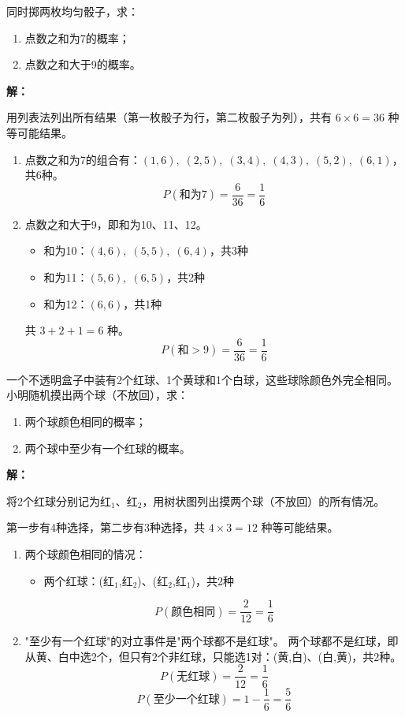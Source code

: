 \documentclass[12pt, a4paper]{ctexart}
\begin{document}
\begin{examplebox}[【例3】列表法求概率]
同时掷两枚均匀骰子，求：
\begin{enumerate}[label=(\arabic*)]
  \item 点数之和为7的概率；
  \item 点数之和大于9的概率。
\end{enumerate}
\end{examplebox}

\textbf{解：}

用列表法列出所有结果（第一枚骰子为行，第二枚骰子为列），共有 $6 \times 6 = 36$ 种等可能结果。

\begin{enumerate}[label=(\arabic*)]
  \item 点数之和为7的组合有：$(1,6),\;(2,5),\;(3,4),\;(4,3),\;(5,2),\;(6,1)$，共6种。
  \[
    P(\text{和为7}) = \frac{6}{36} = \frac{1}{6}
  \]

  \item 点数之和大于9，即和为10、11、12。
  \begin{itemize}[leftmargin=2em]
    \item 和为10：$(4,6),\;(5,5),\;(6,4)$，共3种
    \item 和为11：$(5,6),\;(6,5)$，共2种
    \item 和为12：$(6,6)$，共1种
  \end{itemize}
  共 $3 + 2 + 1 = 6$ 种。
  \[
    P(\text{和}>9) = \frac{6}{36} = \frac{1}{6}
  \]
\end{enumerate}

\begin{examplebox}[【例4】树状图求概率]
一个不透明盒子中装有2个红球、1个黄球和1个白球，这些球除颜色外完全相同。小明随机摸出两个球（不放回），求：
\begin{enumerate}[label=(\arabic*)]
  \item 两个球颜色相同的概率；
  \item 两个球中至少有一个红球的概率。
\end{enumerate}
\end{examplebox}

\textbf{解：}

将2个红球分别记为红$_1$、红$_2$，用树状图列出摸两个球（不放回）的所有情况。

第一步有4种选择，第二步有3种选择，共 $4 \times 3 = 12$ 种等可能结果。

\begin{enumerate}[label=(\arabic*)]
  \item 两个球颜色相同的情况：
  \begin{itemize}[leftmargin=2em]
    \item 两个红球：(红$_1$,红$_2$)、(红$_2$,红$_1$)，共2种
  \end{itemize}
  \[
    P(\text{颜色相同}) = \frac{2}{12} = \frac{1}{6}
  \]

  \item "至少有一个红球"的对立事件是"两个球都不是红球"。
  两个球都不是红球，即从黄、白中选2个，但只有2个非红球，只能选1对：(黄,白)、(白,黄)，共2种。
  \[
    P(\text{无红球}) = \frac{2}{12} = \frac{1}{6}
  \]
  \[
    P(\text{至少一个红球}) = 1 - \frac{1}{6} = \frac{5}{6}
  \]
\end{enumerate}
\end{document}
